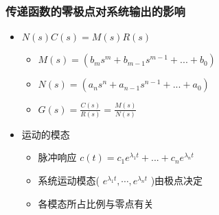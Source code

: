 \documentclass{beamer}
\begin{document}
\begin{frame}
\frametitle{传递函数的零极点对系统输出的影响}
\label{sec-2-5}

\begin{itemize}
\item <2-> $N(s)C(s)=M(s)R(s)$
\begin{itemize}
\item $M(s)=(b_m s^m+b_{m-1}s^{m-1}+...+b_0)$
\item $N(s)=(a_n s^n+a_{n-1}s^{n-1}+...+a_0)$
\item $G(s)=\frac{C(s)}{R(s)}=\frac{M(s)}{N(s)}$
\end{itemize}
\item <3-> 运动的模态
\begin{itemize}
\item 脉冲响应 $c(t)=c_1e^{\lambda_1 t}+...+c_ne^{\lambda_n t}$
\item 系统运动模态( $e^{\lambda_1 t},\cdots,e^{\lambda_n t}$ )由极点决定
\item 各模态所占比例与零点有关
\end{itemize}
\end{itemize}
\end{frame}
\end{document}
